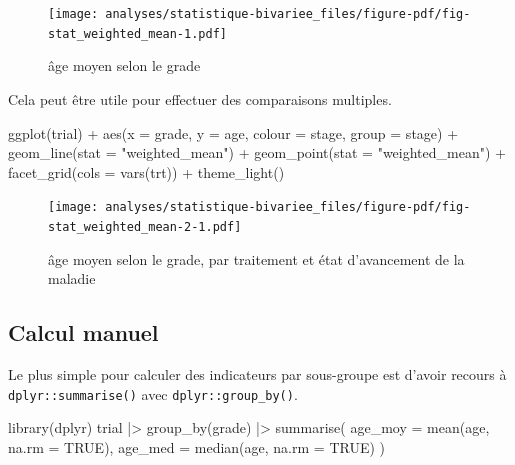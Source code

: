 \documentclass[
  letterpaper,
  DIV=11,
  numbers=noendperiod,
  oneside]{scrreprt}
\newenvironment{Shaded}{\begin{snugshade}}{\end{snugshade}}
\newcommand{\AttributeTok}[1]{\textcolor[rgb]{0.40,0.45,0.13}{#1}}
\newcommand{\ConstantTok}[1]{\textcolor[rgb]{0.56,0.35,0.01}{#1}}
\newcommand{\FunctionTok}[1]{\textcolor[rgb]{0.28,0.35,0.67}{#1}}
\newcommand{\NormalTok}[1]{\textcolor[rgb]{0.00,0.23,0.31}{#1}}
\newcommand{\SpecialCharTok}[1]{\textcolor[rgb]{0.37,0.37,0.37}{#1}}
\newcommand{\StringTok}[1]{\textcolor[rgb]{0.13,0.47,0.30}{#1}}
\begin{document}
\begin{figure}[H]

{\centering \texttt{[image: analyses/statistique-bivariee\_files/figure-pdf/fig-stat\_weighted\_mean-1.pdf]}

}

\caption{\label{fig-stat_weighted_mean}âge moyen selon le grade}

\end{figure}

Cela peut être utile pour effectuer des comparaisons multiples.

\begin{Shaded}
\begin{Highlighting}[]
\FunctionTok{ggplot}\NormalTok{(trial) }\SpecialCharTok{+}
  \FunctionTok{aes}\NormalTok{(}\AttributeTok{x =}\NormalTok{ grade, }\AttributeTok{y =}\NormalTok{ age, }\AttributeTok{colour =}\NormalTok{ stage, }\AttributeTok{group =}\NormalTok{ stage) }\SpecialCharTok{+}
  \FunctionTok{geom\_line}\NormalTok{(}\AttributeTok{stat =} \StringTok{"weighted\_mean"}\NormalTok{) }\SpecialCharTok{+}
  \FunctionTok{geom\_point}\NormalTok{(}\AttributeTok{stat =} \StringTok{"weighted\_mean"}\NormalTok{) }\SpecialCharTok{+}
  \FunctionTok{facet\_grid}\NormalTok{(}\AttributeTok{cols =} \FunctionTok{vars}\NormalTok{(trt)) }\SpecialCharTok{+}
  \FunctionTok{theme\_light}\NormalTok{()}
\end{Highlighting}
\end{Shaded}

\begin{figure}[H]

{\centering \texttt{[image: analyses/statistique-bivariee\_files/figure-pdf/fig-stat\_weighted\_mean-2-1.pdf]}

}

\caption{\label{fig-stat_weighted_mean-2}âge moyen selon le grade, par
traitement et état d'avancement de la maladie}

\end{figure}

\hypertarget{sec-tapply}{%
\subsection{Calcul manuel}\label{sec-tapply}}

Le plus simple pour calculer des indicateurs par sous-groupe est d'avoir
recours à \texttt{dplyr::summarise()} avec \texttt{dplyr::group\_by()}.

\begin{Shaded}
\begin{Highlighting}[]
\FunctionTok{library}\NormalTok{(dplyr)}
\NormalTok{trial }\SpecialCharTok{|\textgreater{}}
  \FunctionTok{group\_by}\NormalTok{(grade) }\SpecialCharTok{|\textgreater{}} 
  \FunctionTok{summarise}\NormalTok{(}
    \AttributeTok{age\_moy =} \FunctionTok{mean}\NormalTok{(age, }\AttributeTok{na.rm =} \ConstantTok{TRUE}\NormalTok{),}
    \AttributeTok{age\_med =} \FunctionTok{median}\NormalTok{(age, }\AttributeTok{na.rm =} \ConstantTok{TRUE}\NormalTok{)}
\NormalTok{  )}
\end{Highlighting}
\end{Shaded}
\end{document}
